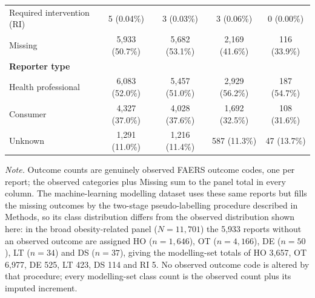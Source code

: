 \documentclass[10pt,a4paper]{article}
\begin{document}
\begin{table}[htbp]
\begin{tabular}{|l|c|c|c|c|}
\quad Required intervention (RI) & 5 (0.04\%) & 3 (0.03\%) & 3 (0.06\%) & 0 (0.00\%) \\
\quad Missing & 5,933 (50.7\%) & 5,682 (53.1\%) & 2,169 (41.6\%) & 116 (33.9\%) \\
\hline
\multicolumn{5}{|l|}{\textbf{Reporter type}} \\
\hline
\quad Health professional & 6,083 (52.0\%) & 5,457 (51.0\%) & 2,929 (56.2\%) & 187 (54.7\%) \\
\quad Consumer & 4,327 (37.0\%) & 4,028 (37.6\%) & 1,692 (32.5\%) & 108 (31.6\%) \\
\quad Unknown & 1,291 (11.0\%) & 1,216 (11.4\%) & 587 (11.3\%) & 47 (13.7\%) \\
\hline
\end{tabular}

\vspace{4pt}
{\footnotesize\raggedright
\textit{Note.} Outcome counts are genuinely observed FAERS outcome codes, one per report; the observed
categories plus Missing sum to the panel total in every column. The machine-learning modelling dataset
uses these same reports but fills the missing outcomes by the two-stage pseudo-labelling procedure
described in Methods, so its class distribution differs from the observed distribution shown here:
in the broad obesity-related panel ($N=11{,}701$) the 5{,}933 reports without an observed outcome
are assigned HO ($n=1{,}646$), OT ($n=4{,}166$), DE ($n=50$), LT ($n=34$) and DS ($n=37$), giving the
modelling-set totals of HO 3{,}657, OT 6{,}977, DE 525, LT 423, DS 114 and RI 5. No observed outcome
code is altered by that procedure; every modelling-set class count is the observed count plus its
imputed increment.\par}

\end{table}
\end{document}
